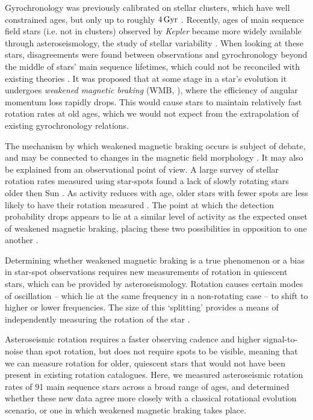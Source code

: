\documentclass[12pt]{article}
\newcommand{\kepler}{\emph{Kepler}\xspace}
\newcommand{\rtwo}[1]{{#1}}
\begin{document}
Gyrochronology was previously calibrated on stellar clusters, which have well constrained ages, but only up to roughly $4\, \rm{Gyr}$ \cite{meibom+2015, barnes+2016}. Recently, ages of main sequence field stars (i.e. not in clusters) observed by \kepler \cite{borucki+2010} became more widely available through asteroseismology, the study of stellar variability \cite{silvaaguirre+2015}. When looking at these stars, disagreements were found between observations and gyrochronology beyond the middle of stars' main sequence lifetimes, which could not be reconciled with existing theories \cite{angus+2015, nielsen+2015, davies+2015}. It was proposed that at some stage in a star's evolution it undergoes \textit{weakened magnetic braking} (WMB, \cite{vansaders+2016}), where the efficiency of angular momentum loss rapidly drops. This would cause stars to maintain relatively fast rotation rates at old ages, which we would not expect from the extrapolation of existing gyrochronology relations.

The mechanism by which weakened magnetic braking occurs is subject of debate, and may be connected to changes in the magnetic field morphology \cite{vansaders+2016,reville+2015,garraffo+2016, metcalfe+2016, metcalfe+2019, see+2019}. It may also be explained from an observational point of view. A large survey of stellar rotation rates measured using star-spots found a lack of slowly rotating stars older then Sun \cite{mcquillan+2014}. As activity reduces with age, older stars with fewer spots are less likely to have their rotation measured \cite{matt+2015, reinhold+2020}. The point at which the detection probability drops appears to lie at a similar level of activity as the expected onset of weakened magnetic braking, placing these two possibilities in opposition to one another \cite{vansaders+2019}.

Determining whether weakened magnetic braking is a true phenomenon or a bias in star-spot observations requires new measurements of rotation in quiescent stars, which can be provided by asteroseismology. \rtwo{Rotation causes certain modes of oscillation -- which lie at the same frequency in a non-rotating case -- to shift to higher or lower frequencies. The size of this `splitting' provides a means of independently measuring the rotation of the star \cite{ledoux1951}}. 

Asteroseismic rotation requires a faster observing cadence and higher signal-to-noise than spot rotation, but does not require spots to be visible, meaning that we can measure rotation for older, quiescent stars that would not have been present in existing rotation catalogues. 
Here, we measured asteroseismic rotation rates of 91 main sequence stars across a broad range of  ages, and determined whether \rtwo{these new data agree} more closely with a classical rotational evolution scenario, or one in which weakened magnetic braking takes place.\\
\end{document}
